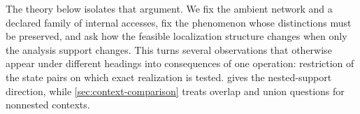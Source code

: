 The theory below isolates that argument. We fix the ambient network and a declared family of internal accesses, fix the phenomenon whose distinctions must be preserved, and ask how the feasible localization structure changes when only the analysis support changes. This turns several observations that otherwise appear under different headings into consequences of one operation: restriction of the state pairs on which exact realization is tested.  gives the nested-support direction, while \cref{sec:context-comparison} treats overlap and union questions for nonnested contexts.

